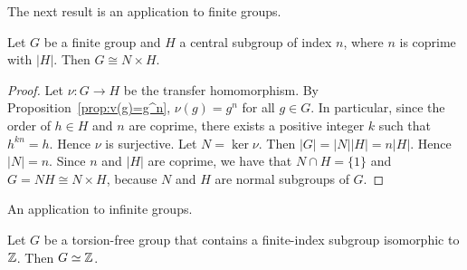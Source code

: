 The next result is an application to finite groups. 

\begin{proposition}
	\label{prop:semidirecto}
	Let $G$ be a finite group and $H$ a central subgroup of index $n$, where 
	$n$ is coprime with $|H|$. Then
	$G\cong N\times H$.
\end{proposition}

\begin{proof} Let $\nu \colon G\to H$ be the transfer homomorphism.
	 By Proposition~\ref{prop:v(g)=g^n}, 
		$\nu(g)=g^n$ for all $g\in G$. In particular, since the order of $h\in H$ and $n$ are coprime, there exists a positive integer $k$ such that $h^{kn}=h$. Hence $\nu$ is surjective. Let $N=\ker \nu$. Then $|G|=|N||H|=n|H|$. Hence $|N|=n$. Since $n$ and $|H|$ are coprime, we have that $N\cap H=\{ 1\}$ and $G=NH\cong N\times H$, because $N$ and $H$ are normal subgroups of $G$. 
\end{proof}




An application to infinite groups. 

\begin{theorem}\label{thm:Zfiniteindex}
	Let $G$ be a torsion-free group that contains a finite-index subgroup isomorphic to  
	$\mathbb{Z}$. Then $G\simeq\mathbb{Z}$.
\end{theorem}

